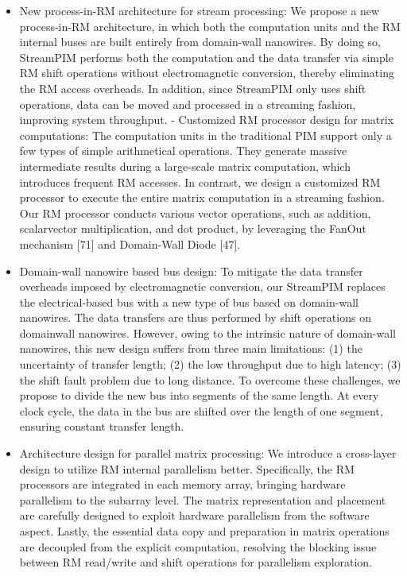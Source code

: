 \documentclass[10pt]{article}
\begin{document}
\begin{itemize}
  \item New process-in-RM architecture for stream processing: We propose a new process-in-RM architecture, in which both the computation units and the RM internal buses are built entirely from domain-wall nanowires. By doing so, StreamPIM performs both the computation and the data transfer via simple RM shift operations without electromagnetic conversion, thereby eliminating the RM access overheads. In addition, since StreamPIM only uses shift operations, data can be moved and processed in a streaming fashion, improving system throughput. - Customized RM processor design for matrix computations: The computation units in the traditional PIM support only a few types of simple arithmetical operations. They generate massive intermediate results during a large-scale matrix computation, which introduces frequent RM accesses. In contrast, we design a customized RM processor to execute the entire matrix computation in a streaming fashion. Our RM processor conducts various vector operations, such as addition, scalarvector multiplication, and dot product, by leveraging the FanOut mechanism [71] and Domain-Wall Diode [47].

  \item Domain-wall nanowire based bus design: To mitigate the data transfer overheads imposed by electromagnetic conversion, our StreamPIM replaces the electrical-based bus with a new type of bus based on domain-wall nanowires. The data transfers are thus performed by shift operations on domainwall nanowires. However, owing to the intrinsic nature of domain-wall nanowires, this new design suffers from three main limitations: (1) the uncertainty of transfer length; (2) the low throughput due to high latency; (3) the shift fault problem due to long distance. To overcome these challenges, we propose to divide the new bus into segments of the same length. At every clock cycle, the data in the bus are shifted over the length of one segment, ensuring constant transfer length.

  \item Architecture design for parallel matrix processing: We introduce a cross-layer design to utilize RM internal parallelism better. Specifically, the RM processors are integrated in each memory array, bringing hardware parallelism to the subarray level. The matrix representation and placement are carefully designed to exploit hardware parallelism from the software aspect. Lastly, the essential data copy and preparation in matrix operations are decoupled from the explicit computation, resolving the blocking issue between RM read/write and shift operations for parallelism exploration.

\end{itemize}
\end{document}
